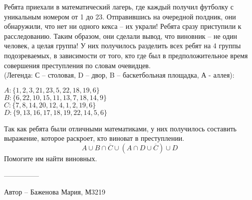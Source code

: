 \question
Ребята приехали в математический лагерь, где каждый получил футболку с уникальным номером от 1 до 23. Отправившись на очередной полдник, они обнаружили, что нет ни одного кекса – их украли! Ребята сразу приступили к расследованию. Таким образом, они сделали вывод, что виновник – не один человек, а целая группа! У них получилось разделить всех ребят на 4 группы подозреваемых, в зависимости от того, кто где был в предположительное время совершения преступления по словам очевидцев.
\\(Легенда: С – столовая, D – двор, B – баскетбольная площадка, А - аллея): 
\begin{center}
$A: \{1, 2, 3, 21, 23, 5, 22, 18, 19, 6\}$
\\
$B: \{6, 22, 10, 15, 11, 13, 7, 18, 14, 9\}$
\\
$C: \{7, 8, 14, 20, 12, 4, 1, 2, 19, 6\}$
\\
$D: \{9, 13, 16, 17, 18, 19, 22, 14, 5, 6\}$
\end{center}
Так как ребята были отличными математиками, у них получилось составить выражение, которое раскроет, кто виноват в преступлении. 
\begin{equation*}
    A \cup B \cap \overline{C} \cup (A \cap D \cup \overline{C}) \cup D
\end{equation*}
Помогите им найти виновных.

---------------

Автор -- Баженова Мария, М3219